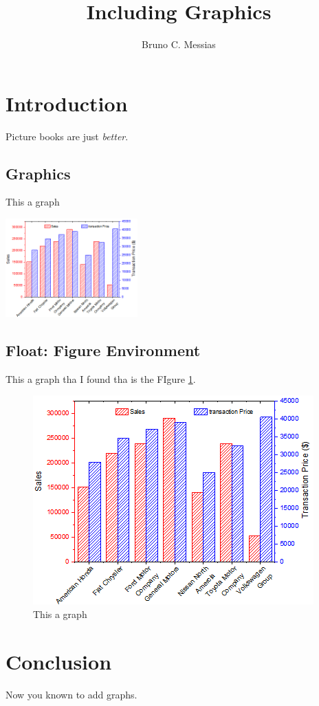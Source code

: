 \documentclass{proc}
\title{Including Graphics}
\author{Bruno C. Messias}
\date{}
\begin{document}
\maketitle

\section{Introduction}

Picture books are just \emph{better}.

\subsection{Graphics}

This a graph

\bigskip

\includegraphics[width=2in]{DoubleY_Column.png}


\subsection{Float: Figure Environment}

This a graph tha I found tha is the FIgure \ref{graph}.

\begin{figure}[htbp]
    \centering
    \includegraphics{DoubleY_Column.png}
    \caption{This a graph}
    \label{graph}
\end{figure}

\subsection{}


\section{Conclusion}

Now you known to add graphs.
\end{document}

